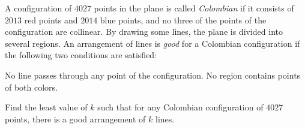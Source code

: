 A configuration of $4027$ points in the plane is called
\emph{Colombian} if it consists of $2013$ red points and $2014$ blue points,
and no three of the points of the configuration are collinear.
By drawing some lines, the plane is divided into several regions.
An arrangement of lines is \emph{good} for a Colombian configuration
if the following two conditions are satisfied:
\begin{enumerate}
  \ii[(i)] No line passes through any point of the configuration.
  \ii[(ii)] No region contains points of both colors.
\end{enumerate}
Find the least value of $k$ such that for any Colombian configuration
of $4027$ points, there is a good arrangement of $k$ lines.